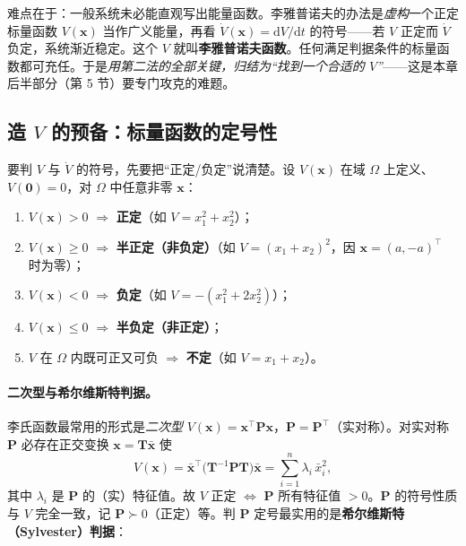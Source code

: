 \noindent 难点在于：一般系统未必能直观写出能量函数。李雅普诺夫的办法是\emph{虚构}一个正定标量函数 $V(\mathbf{x})$ 当作广义能量，再看 $\dot V(\mathbf{x})=\mathrm{d}V/\mathrm{d}t$ 的符号——若 $V$ 正定而 $\dot V$ 负定，系统渐近稳定。这个 $V$ 就叫\textbf{李雅普诺夫函数}。任何满足判据条件的标量函数都可充任。于是\emph{用第二法的全部关键，归结为“找到一个合适的 $V$”}——这是本章后半部分（第 5 节）要专门攻克的难题。

\subsection{造 \texorpdfstring{$V$}{V} 的预备：标量函数的定号性}
\label{sec:lyap-definite}

要判 $V$ 与 $\dot V$ 的符号，先要把“正定/负定”说清楚。设 $V(\mathbf{x})$ 在域 $\Omega$ 上定义、$V(\mathbf{0})=0$，对 $\Omega$ 中任意非零 $\mathbf{x}$：

\begin{definition}[标量函数的定号性]\label{def:definiteness}
\begin{enumerate}
  \item $V(\mathbf{x})>0$ $\Rightarrow$ \textbf{正定}（如 $V=x_1^2+x_2^2$）；
  \item $V(\mathbf{x})\ge0$ $\Rightarrow$ \textbf{半正定（非负定）}（如 $V=(x_1+x_2)^2$，因 $\mathbf{x}=(a,-a)^\top$ 时为零）；
  \item $V(\mathbf{x})<0$ $\Rightarrow$ \textbf{负定}（如 $V=-(x_1^2+2x_2^2)$）；
  \item $V(\mathbf{x})\le0$ $\Rightarrow$ \textbf{半负定（非正定）}；
  \item $V$ 在 $\Omega$ 内既可正又可负 $\Rightarrow$ \textbf{不定}（如 $V=x_1+x_2$）。
\end{enumerate}
\end{definition}

\paragraph{二次型与希尔维斯特判据。}
李氏函数最常用的形式是\emph{二次型} $V(\mathbf{x})=\mathbf{x}^\top\mathbf{P}\mathbf{x}$，$\mathbf{P}=\mathbf{P}^\top$（实对称）。对实对称 $\mathbf{P}$ 必存在正交变换 $\mathbf{x}=\mathbf{T}\bar{\mathbf{x}}$ 使
\begin{equation}
  V(\mathbf{x})=\bar{\mathbf{x}}^\top\big(\mathbf{T}^{-1}\mathbf{P}\mathbf{T}\big)\bar{\mathbf{x}}=\sum_{i=1}^n\lambda_i\,\bar x_i^2,
  \label{eq:quad-canonical}
\end{equation}
其中 $\lambda_i$ 是 $\mathbf{P}$ 的（实）特征值。故 $V$ 正定 $\iff$ $\mathbf{P}$ 所有特征值 $>0$。$\mathbf{P}$ 的符号性质与 $V$ 完全一致，记 $\mathbf{P}\succ0$（正定）等。判 $\mathbf{P}$ 定号最实用的是\textbf{希尔维斯特（Sylvester）判据}：

